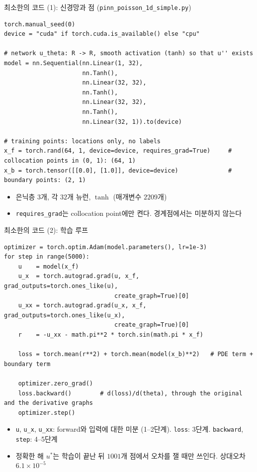 \documentclass[aspectratio=169,11pt]{beamer}
\begin{document}
\begin{frame}[fragile]{최소한의 코드 (1): 신경망과 점 (\texttt{pinn\_poisson\_1d\_simple.py})}
\begin{lstlisting}
torch.manual_seed(0)
device = "cuda" if torch.cuda.is_available() else "cpu"

# network u_theta: R -> R, smooth activation (tanh) so that u'' exists
model = nn.Sequential(nn.Linear(1, 32),
                      nn.Tanh(),
                      nn.Linear(32, 32),
                      nn.Tanh(),
                      nn.Linear(32, 32),
                      nn.Tanh(),
                      nn.Linear(32, 1)).to(device)

# training points: locations only, no labels
x_f = torch.rand(64, 1, device=device, requires_grad=True)     # collocation points in (0, 1): (64, 1)
x_b = torch.tensor([[0.0], [1.0]], device=device)              # boundary points: (2, 1)
\end{lstlisting}
\begin{itemize}
\item 은닉층 $3$개, 각 $32$개 뉴런, $\tanh$ (매개변수 $2209$개)
\item \texttt{requires\_grad}는 collocation point에만 켠다. 경계점에서는 미분하지 않는다
\end{itemize}
\end{frame}

\begin{frame}[fragile]{최소한의 코드 (2): 학습 루프}
\begin{lstlisting}
optimizer = torch.optim.Adam(model.parameters(), lr=1e-3)
for step in range(5000):
    u    = model(x_f)
    u_x  = torch.autograd.grad(u, x_f, grad_outputs=torch.ones_like(u),
                               create_graph=True)[0]
    u_xx = torch.autograd.grad(u_x, x_f, grad_outputs=torch.ones_like(u_x),
                               create_graph=True)[0]
    r    = -u_xx - math.pi**2 * torch.sin(math.pi * x_f)

    loss = torch.mean(r**2) + torch.mean(model(x_b)**2)   # PDE term + boundary term

    optimizer.zero_grad()
    loss.backward()        # d(loss)/d(theta), through the original and the derivative graphs
    optimizer.step()
\end{lstlisting}
\small
\begin{itemize}
\item \texttt{u}, \texttt{u\_x}, \texttt{u\_xx}: forward와 입력에 대한 미분 (1--2단계). \texttt{loss}: 3단계. \texttt{backward}, \texttt{step}: 4--5단계
\item 정확한 해 $u^*$는 학습이 끝난 뒤 $1001$개 점에서 오차를 잴 때만 쓰인다. 상대오차 $6.1\times10^{-5}$
\end{itemize}
\end{frame}
\end{document}
